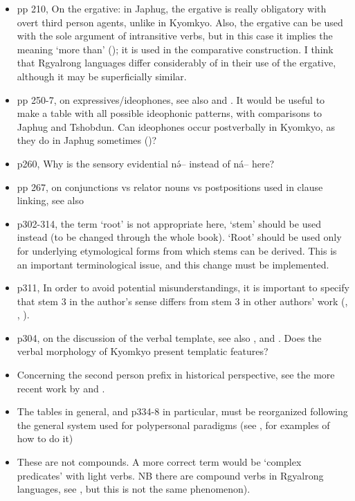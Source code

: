 \documentclass[oldfontcommands,oneside,a4paper,11pt]{article}
\newcommand{\ipa}[1]{{\phon \mbox{#1}}} %
\begin{document}
\begin{itemize}
\item pp 210, On the ergative: in Japhug, the ergative is really obligatory with overt third person agents, unlike in Kyomkyo. Also, the ergative can be used with the sole argument of intransitive verbs, but in this case it implies the meaning `more than' (\citet[202]{jacques12demotion}); it is used in the comparative construction. I think that Rgyalrong languages differ considerably of in their use of the ergative, although it may be superficially similar.
\item pp 250-7, on expressives/ideophones, see also \citet{japhug14ideophones} and \citet{jackson14morpho}. It would be useful to make a table with all possible ideophonic patterns, with comparisons to Japhug and Tshobdun. Can ideophones occur postverbally in Kyomkyo, as they do in Japhug sometimes (\citealt[275]{japhug14ideophones})?
\item p260, Why is the sensory evidential \ipa{nə́--} instead of \ipa{ná--} here?
\item pp 267, on conjunctions vs relator nouns vs postpositions used in clause linking, see also \citet{jacques14linking}
\item p302-314, the term `root' is not appropriate here, `stem' should be used instead (to be changed through the whole book). `Root' should be used only for underlying etymological forms from which stems can be derived. This is an important terminological issue, and this change must be implemented.
\item p311, In order to avoid potential misunderstandings, it is important to specify that stem 3 in the author's sense differs from stem 3 in other authors' work (\citealt{jackson00sidaba}, \citealt{jacques04these}, \citealt{gongxun14agreement}).
\item p304, on the discussion of the verbal template, see also \citet[197-199]{jacques13harmonization}, \citet[12]{jacques14antipassive} and \citet{lai13affixale}. Does the verbal morphology of Kyomkyo present templatic features?
\item Concerning the second person prefix in historical perspective, see the more recent work by \citet{jacques12agreement} and \citet{delancey14second}.
\item The tables in general, and p334-8 in particular, must be reorganized following the general system used for polypersonal paradigms (see \citet{gongxun14agreement}, \citet{jacques14inverse} for examples of how to do it)
\item These are not compounds. A more correct term would be `complex predicates' with light verbs. NB there are compound verbs in Rgyalrong languages, see \citet{jacques12incorp}, but this is not the same phenomenon).

\end{itemize}
\end{document}
